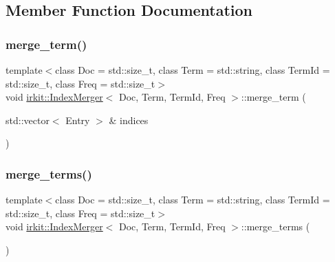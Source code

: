 \subsection{Member Function Documentation}
\mbox{\label{classirkit_1_1IndexMerger_aabfc3277d370138aa02a8ee48da810db}} 
\subsubsection{\texorpdfstring{merge\+\_\+term()}{merge\_term()}}
{\footnotesize\ttfamily template$<$class Doc  = std\+::size\+\_\+t, class Term  = std\+::string, class Term\+Id  = std\+::size\+\_\+t, class Freq  = std\+::size\+\_\+t$>$ \\
void \mbox{\hyperlink{classirkit_1_1IndexMerger}{irkit\+::\+Index\+Merger}}$<$ Doc, Term, Term\+Id, Freq $>$\+::merge\+\_\+term (\begin{DoxyParamCaption}\item[{std\+::vector$<$ Entry $>$ \&}]{indices }\end{DoxyParamCaption})\hspace{0.3cm}{\ttfamily [inline]}}

\mbox{\label{classirkit_1_1IndexMerger_a1dcf1ca9ee8faa142b9d38bde59757fa}} 
\subsubsection{\texorpdfstring{merge\+\_\+terms()}{merge\_terms()}}
{\footnotesize\ttfamily template$<$class Doc  = std\+::size\+\_\+t, class Term  = std\+::string, class Term\+Id  = std\+::size\+\_\+t, class Freq  = std\+::size\+\_\+t$>$ \\
void \mbox{\hyperlink{classirkit_1_1IndexMerger}{irkit\+::\+Index\+Merger}}$<$ Doc, Term, Term\+Id, Freq $>$\+::merge\+\_\+terms (\begin{DoxyParamCaption}{ }\end{DoxyParamCaption})\hspace{0.3cm}{\ttfamily [inline]}}

